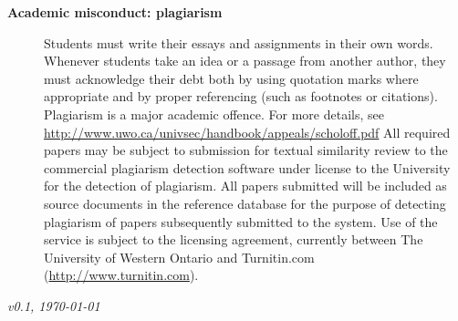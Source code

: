 \documentclass[12pt]{article}
\begin{document}
\begin{description}
\item[\bf Academic misconduct: plagiarism] Students must write their essays and assignments in their own words. Whenever students take an idea or a passage from another author, they must acknowledge their debt both by using quotation marks where appropriate and by proper referencing (such as footnotes or citations). Plagiarism is a major academic offence. For more details, see \url{http://www.uwo.ca/univsec/handbook/appeals/scholoff.pdf}
All required papers may be subject to submission for textual similarity review to the commercial plagiarism detection software under license to the University for the detection of plagiarism. All papers submitted will be included as source documents in the reference database for the purpose of detecting plagiarism of papers subsequently submitted to the system. Use of the service is subject to the licensing agreement, currently between The University of Western Ontario and Turnitin.com (\url{http://www.turnitin.com}).
\end{description}

{\em v0.1, \today}
\end{document}
